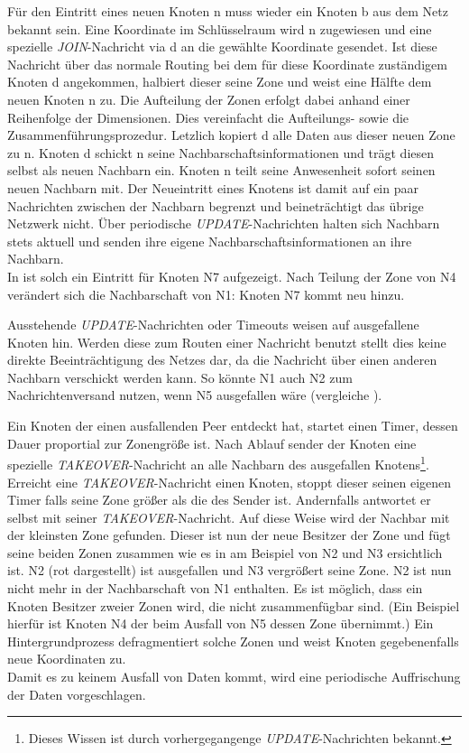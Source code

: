 Für den Eintritt eines neuen Knoten n muss wieder ein Knoten b aus dem Netz bekannt sein. Eine Koordinate im Schlüsselraum wird n zugewiesen und eine spezielle \emph{JOIN}-Nachricht via d an die gewählte Koordinate gesendet. Ist diese Nachricht über das normale Routing bei dem für diese Koordinate zuständigem Knoten d angekommen, halbiert dieser seine Zone und weist eine Hälfte dem neuen Knoten n zu. Die Aufteilung der Zonen erfolgt dabei anhand einer Reihenfolge der Dimensionen. Dies vereinfacht die Aufteilungs- sowie die Zusammenführungsprozedur. Letzlich kopiert d alle Daten aus dieser neuen Zone zu n. Knoten d schickt n seine Nachbarschaftsinformationen und trägt diesen selbst als neuen Nachbarn ein. Knoten n teilt seine Anwesenheit sofort seinen neuen Nachbarn mit. Der Neueintritt eines Knotens ist damit auf ein paar Nachrichten zwischen der Nachbarn begrenzt und beineträchtigt das übrige Netzwerk nicht. Über periodische \emph{UPDATE}-Nachrichten halten sich Nachbarn stets aktuell und senden ihre eigene Nachbarschaftsinformationen an ihre Nachbarn.\\
In  ist solch ein Eintritt für Knoten N7 aufgezeigt. Nach Teilung der Zone von N4 verändert sich die Nachbarschaft von N1: Knoten N7 kommt neu hinzu.

Ausstehende \emph{UPDATE}-Nachrichten oder Timeouts weisen auf ausgefallene Knoten hin. Werden diese zum Routen einer Nachricht benutzt stellt dies keine direkte Beeinträchtigung des Netzes dar, da die Nachricht über einen anderen Nachbarn verschickt werden kann. So könnte N1 auch N2 zum Nachrichtenversand nutzen, wenn N5 ausgefallen wäre (vergleiche ).

Ein Knoten der einen ausfallenden Peer entdeckt hat, startet einen Timer, dessen Dauer proportial zur Zonengröße ist. Nach Ablauf sender der Knoten eine spezielle \emph{TAKEOVER}-Nachricht an alle Nachbarn des ausgefallen Knotens\footnote{Dieses Wissen ist durch vorhergegangenge \emph{UPDATE}-Nachrichten bekannt.}. Erreicht eine \emph{TAKEOVER}-Nachricht einen Knoten, stoppt dieser seinen eigenen Timer falls seine Zone größer als die des Sender ist. Andernfalls antwortet er selbst mit seiner \emph{TAKEOVER}-Nachricht. Auf diese Weise wird der Nachbar mit der kleinsten Zone gefunden. Dieser ist nun der neue Besitzer der Zone und fügt seine beiden Zonen zusammen wie es in  am Beispiel von N2 und N3 ersichtlich ist. N2 (rot dargestellt) ist ausgefallen und N3 vergrößert seine Zone. N2 ist nun nicht mehr in der Nachbarschaft von N1 enthalten. Es ist möglich, dass ein Knoten Besitzer zweier Zonen wird, die nicht zusammenfügbar sind. (Ein Beispiel hierfür ist Knoten N4 der beim Ausfall von N5 dessen Zone übernimmt.) Ein Hintergrundprozess defragmentiert solche Zonen und weist Knoten gegebenenfalls neue Koordinaten zu.\\
Damit es zu keinem Ausfall von Daten kommt, wird eine periodische Auffrischung der Daten vorgeschlagen.

